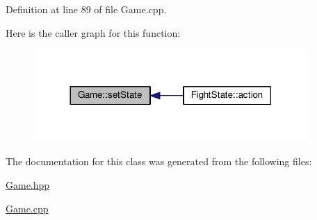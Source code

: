 Definition at line 89 of file Game.\-cpp.



Here is the caller graph for this function\-:
\nopagebreak
\begin{figure}[H]
\begin{center}
\leavevmode
\includegraphics[width=296pt]{class_game_a9aa1730ad9b8b9bf02bf591b65c9c2c7_icgraph}
\end{center}
\end{figure}




The documentation for this class was generated from the following files\-:\begin{DoxyCompactItemize}
\item 
\hyperlink{_game_8hpp}{Game.\-hpp}\item 
\hyperlink{_game_8cpp}{Game.\-cpp}\end{DoxyCompactItemize}
